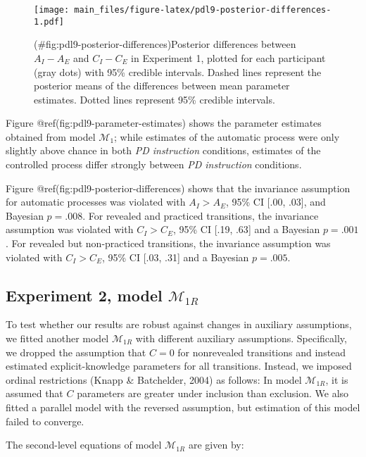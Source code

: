 \begin{appendix}
\begin{figure}
\centering
\texttt{[image: main\_files/figure-latex/pdl9-posterior-differences-1.pdf]}
\caption{(\#fig:pdl9-posterior-differences)Posterior differences between
\(A_I - A_E\) and \(C_I - C_E\) in Experiment 1, plotted for each
participant (gray dots) with 95\% credible intervals. Dashed lines
represent the posterior means of the differences between mean parameter
estimates. Dotted lines represent 95\% credible intervals.}
\end{figure}

Figure @ref(fig:pdl9-parameter-estimates) shows the parameter estimates
obtained from model \(\mathcal{M}_1\); while estimates of the automatic
process were only slightly above chance in both \emph{PD instruction}
conditions, estimates of the controlled process differ strongly between
\emph{PD instruction} conditions.

Figure @ref(fig:pdl9-posterior-differences) shows that the invariance
assumption for automatic processes was violated with \(A_I > A_E\), 95\%
CI {[}.00, .03{]}, and Bayesian \(p = .008\). For revealed and practiced
transitions, the invariance assumption was violated with \(C_I > C_E\),
95\% CI {[}.19, .63{]} and a Bayesian \(p = .001\). For revealed but
non-practiced transitions, the invariance assumption was violated with
\(C_I > C_E\), 95\% CI {[}.03, .31{]} and a Bayesian \(p = .005\).

\hypertarget{experiment-2-model-mathcalm_1r}{%
\subsection{\texorpdfstring{Experiment 2, model
\(\mathcal{M}_{1R}\)}{Experiment 2, model \textbackslash{}mathcal\{M\}\_\{1R\}}}\label{experiment-2-model-mathcalm_1r}}

To test whether our results are robust against changes in auxiliary
assumptions, we fitted another model \(\mathcal{M}_{1R}\) with different
auxiliary assumptions. Specifically, we dropped the assumption that
\(C=0\) for nonrevealed transitions and instead estimated
explicit-knowledge parameters for all transitions. Instead, we imposed
ordinal restrictions (Knapp \& Batchelder, 2004) as follows: In model
\(\mathcal{M}_{1R}\), it is assumed that \(C\) parameters are greater
under inclusion than exclusion. We also fitted a parallel model with the
reversed assumption, but estimation of this model failed to converge.

The second-level equations of model \(\mathcal{M}_{1R}\) are given by:


\end{appendix}
